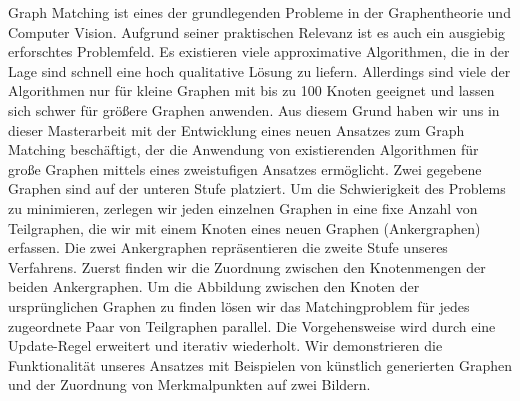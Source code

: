 Graph Matching ist eines der grundlegenden Probleme in der Graphentheorie und Computer Vision. Aufgrund seiner praktischen Relevanz ist es auch ein ausgiebig erforschtes Problemfeld. Es existieren viele approximative Algorithmen, die in der Lage sind schnell eine hoch qualitative Lösung zu liefern. Allerdings sind viele der Algorithmen nur für kleine Graphen mit bis zu 100 Knoten geeignet und lassen sich schwer für größere Graphen anwenden. Aus diesem Grund haben wir uns in dieser Masterarbeit mit der Entwicklung eines neuen Ansatzes zum Graph Matching beschäftigt, der die Anwendung von existierenden Algorithmen für große Graphen mittels eines zweistufigen Ansatzes ermöglicht. Zwei gegebene Graphen sind auf der unteren Stufe platziert. Um die Schwierigkeit des Problems zu minimieren, zerlegen wir jeden einzelnen Graphen in eine fixe Anzahl von Teilgraphen, die wir mit einem Knoten eines neuen Graphen (Ankergraphen) erfassen. Die zwei Ankergraphen repräsentieren die zweite Stufe unseres Verfahrens. Zuerst finden wir die Zuordnung zwischen den Knotenmengen der beiden Ankergraphen. Um die Abbildung zwischen den Knoten der ursprünglichen Graphen zu finden lösen wir das Matchingproblem  für jedes zugeordnete Paar von Teilgraphen parallel. Die Vorgehensweise wird durch eine Update-Regel erweitert und iterativ wiederholt. Wir demonstrieren die Funktionalit\"{a}t unseres Ansatzes mit Beispielen von künstlich generierten Graphen und der Zuordnung von Merkmalpunkten auf zwei Bildern.